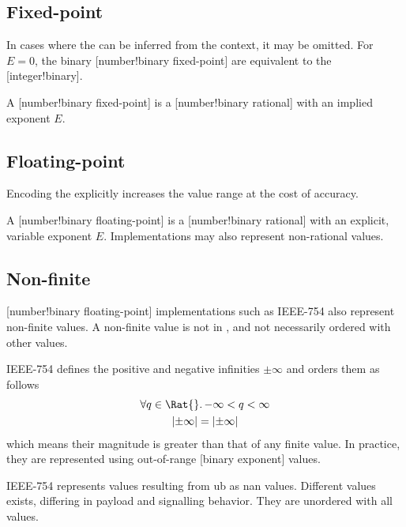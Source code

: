 \subsection{Fixed-point}

In cases where the  can be inferred from the context, it may be omitted.
For \(E=0\), the binary [number!binary fixed-point] are equivalent to the [integer!binary].

\begin{definition}
    A [number!binary fixed-point] is a [number!binary rational] with an implied exponent \(E\).
\end{definition}

\subsection{Floating-point}

Encoding the  explicitly increases the value range at the cost of accuracy.

\begin{definition}
    A [number!binary floating-point] is a [number!binary rational] with an explicit, variable exponent \(E\).
    Implementations may also represent non-rational values.
\end{definition}

\subsection{Non-finite}

[number!binary floating-point] implementations such as IEEE-754 \cite{IEEE_754} also represent non-finite values.
A non-finite value is not in \Rat{}, and not necessarily ordered with other values.

IEEE-754 defines the positive and negative infinities \(\pm\infty\) and orders them as follows
\begin{gather*}
    \forall q \in \Rat{}\ldotp -\infty < q < \infty \\
    \lvert\pm\infty\rvert = \lvert\pm\infty\rvert
\end{gather*}
which means their magnitude is greater than that of any finite value.
In practice, they are represented using out-of-range [binary exponent] values.

IEEE-754 represents values resulting from \gls{ub} as \gls{nan} values.
Different values exists, differing in payload and signalling behavior.
They are unordered with all values.
